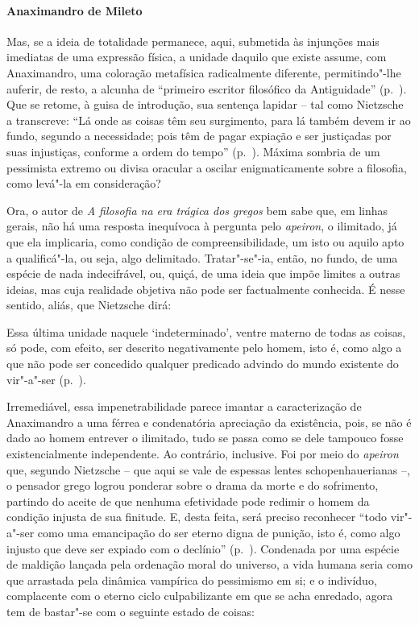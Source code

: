\paragraph{Anaximandro de Mileto} Mas, se a ideia de totalidade permanece, aqui, submetida às injunções
mais imediatas de uma expressão física, a unidade daquilo que existe
assume, com Anaximandro, uma coloração metafísica radicalmente
diferente, permitindo"-lhe auferir, de resto, a alcunha de
``primeiro escritor filosófico da
Antiguidade'' (p.~\pageref{primeiroescritor}). Que se
retome, à guisa de introdução, sua sentença lapidar -- tal como Nietzsche
a transcreve: ``Lá onde as coisas têm seu surgimento, para lá também
devem ir ao fundo, segundo a necessidade; pois têm de pagar expiação e
ser justiçadas por suas injustiças, conforme a ordem do
tempo'' (p.~\pageref{laondeascoisas}). Máxima sombria de um pessimista
extremo ou divisa oracular a oscilar enigmaticamente sobre a filosofia,
como levá"-la em consideração? 

Ora, o autor de \textit{A filosofia na era trágica dos gregos} bem sabe
que, em linhas gerais, não há uma resposta inequívoca à pergunta pelo
\textit{apeiron}, o ilimitado, já que ela implicaria, como condição de
compreensibilidade, um isto ou aquilo apto a qualificá"-la, ou seja,
algo delimitado. Tratar"-se"-ia, então, no fundo, de uma espécie de nada
indecifrável, ou, quiçá, de uma ideia que impõe limites a outras
ideias, mas cuja realidade objetiva não pode ser factualmente
conhecida. É nesse sentido, aliás, que Nietzsche dirá:

\begin{hedraquote} 
Essa última unidade naquele
`indeterminado', ventre materno de
todas as coisas, só pode, com efeito, ser descrito negativamente pelo
homem, isto é, como algo a que não pode ser concedido qualquer
predicado advindo do mundo existente do
vir"-a"-ser (p.~\pageref{essaultimaunidade}).
\end{hedraquote} 

 Irremediável, essa impenetrabilidade parece imantar a caracterização de
Anaximandro a uma férrea e condenatória apreciação da existência, pois,
se não é dado ao homem entrever o ilimitado, tudo se passa como se dele
tampouco fosse existencialmente independente. Ao contrário, inclusive.
Foi por meio do \textit{apeiron} que, segundo Nietzsche -- que aqui se
vale de espessas lentes schopenhauerianas --, o pensador grego logrou
ponderar sobre o drama da morte e do sofrimento, partindo do aceite de
que nenhuma efetividade pode redimir o homem da condição injusta de sua
finitude. E, desta feita, será preciso reconhecer ``todo
vir"-a"-ser como uma emancipação do ser eterno digna de punição, isto é,
como algo injusto que deve ser expiado com o
declínio'' (p.~\pageref{sereterno}). Condenada por
uma espécie de maldição lançada pela ordenação moral do universo, a
vida humana seria como que arrastada pela dinâmica vampírica do
pessimismo em si; e o indivíduo, complacente com o eterno ciclo
culpabilizante em que se acha enredado, agora tem de bastar"-se com o
seguinte estado de coisas: 

